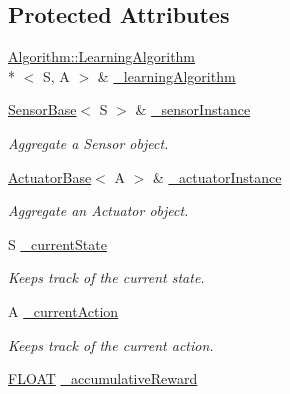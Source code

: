 \subsection*{Protected Attributes}
\begin{DoxyCompactItemize}
\item 
\hyperlink{classAI_1_1Algorithm_1_1LearningAlgorithm}{Algorithm\+::\+Learning\+Algorithm}\\*
$<$ S, A $>$ \& \hyperlink{classAI_1_1Agent_ae61529c109e21748dca77509b58f1f8e}{\+\_\+learning\+Algorithm}
\item 
\hypertarget{classAI_1_1Agent_a0f3b3a246bc3b2f8a833c628b3fa1b67}{\hyperlink{classAI_1_1SensorBase}{Sensor\+Base}$<$ S $>$ \& \hyperlink{classAI_1_1Agent_a0f3b3a246bc3b2f8a833c628b3fa1b67}{\+\_\+sensor\+Instance}}\label{classAI_1_1Agent_a0f3b3a246bc3b2f8a833c628b3fa1b67}

\begin{DoxyCompactList}\small\item\em Aggregate a Sensor object. \end{DoxyCompactList}\item 
\hypertarget{classAI_1_1Agent_af1cd837b1b9d626fee6bfc1b0cca4f33}{\hyperlink{classAI_1_1ActuatorBase}{Actuator\+Base}$<$ A $>$ \& \hyperlink{classAI_1_1Agent_af1cd837b1b9d626fee6bfc1b0cca4f33}{\+\_\+actuator\+Instance}}\label{classAI_1_1Agent_af1cd837b1b9d626fee6bfc1b0cca4f33}

\begin{DoxyCompactList}\small\item\em Aggregate an Actuator object. \end{DoxyCompactList}\item 
\hypertarget{classAI_1_1Agent_a3476836f8e24014e2d0e5bd3fcd06c4f}{S \hyperlink{classAI_1_1Agent_a3476836f8e24014e2d0e5bd3fcd06c4f}{\+\_\+current\+State}}\label{classAI_1_1Agent_a3476836f8e24014e2d0e5bd3fcd06c4f}

\begin{DoxyCompactList}\small\item\em Keeps track of the current state. \end{DoxyCompactList}\item 
\hypertarget{classAI_1_1Agent_a92741f4d9a5324c909e63ab330379411}{A \hyperlink{classAI_1_1Agent_a92741f4d9a5324c909e63ab330379411}{\+\_\+current\+Action}}\label{classAI_1_1Agent_a92741f4d9a5324c909e63ab330379411}

\begin{DoxyCompactList}\small\item\em Keeps track of the current action. \end{DoxyCompactList}\item 
\hyperlink{namespaceAI_a41b74884a20833db653dded3918e05c3}{F\+L\+O\+A\+T} \hyperlink{classAI_1_1Agent_aa4c5b41816bb39212727186a4af1afec}{\+\_\+accumulative\+Reward}
\end{DoxyCompactItemize}


